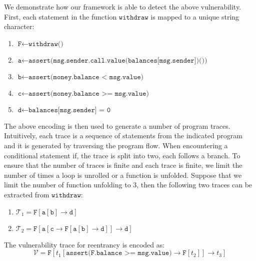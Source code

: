 \documentclass[runningheads]{llncs}
\newcommand{\code}[1]{\texttt{#1}}
\begin{document}
We demonstrate how our framework is able to detect the above vulnerability. First, each statement in the function $\code{withdraw}$ is mapped to a unique string character:
\begin{enumerate}
	\item $\code{F} \leftarrow \code{withdraw()}$
	\item $\code{a} \leftarrow \code{assert(msg.sender.call.value(balances[msg.sender])())}$
	\item $\code{b} \leftarrow \code{assert(money.balance < msg.value)}$
	\item  $\code{c} \leftarrow \code{assert(money.balance >= msg.value)}$
	\item  $\code{d} \leftarrow \code{balances[msg.sender] = 0}$
\end{enumerate}

The above encoding is then used to generate a number of program traces. Intuitively, each trace is a sequence of statements from the indicated program and it is generated by traversing the program flow. When encountering a conditional statement if, the trace is split into two, each follows a branch. To ensure that the number of traces is finite and each trace is finite, we limit the number of times a loop is unrolled or a function is unfolded. Suppose that we limit the number of function unfolding to 3, then the following two traces can be extracted from $\code{withdraw}$:
\begin{enumerate}
	\item $
	\mathcal{T}_1 = \code{F}[\code{a}[\code{b}] \rightarrow \code{d}]$
	\item $\mathcal{T}_2 = \code{F}[\code{a}[\code{c} \rightarrow \code{F}[\code{a}[\code{b}] \rightarrow \code{d} ]] \rightarrow \code{d}]
	$
\end{enumerate}

The vulnerability trace for reentrancy is encoded as:
$$
\mathcal{V} = \code{F}[t_1[\code{assert(F.balance >= msg.value)} \rightarrow \code{F}[t_2]] \rightarrow t_3]
$$
\end{document}
